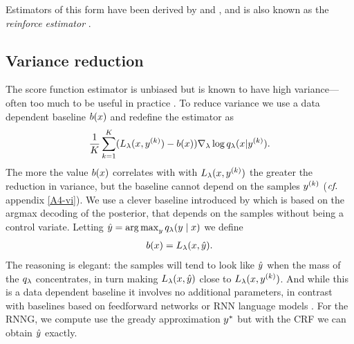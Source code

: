     Estimators of this form have been derived by \citet{williams1992reinforce,paisley2012viss,mnih2014nvil,ranganath2014black} and \citet{mnih2016variational}, and is also known as the \textit{reinforce estimator} \citep{williams1992reinforce}.

  \subsection{Variance reduction}
    The score function estimator is unbiased but is known to have high variance---often too much to be useful in practice  \citep{paisley2012viss}. To reduce variance we use a data dependent baseline $b(x)$ and redefine the estimator as
    \begin{align}
      \frac{1}{K}\sum_{k=1}^K  (L_{\lambda}(x, y^{(k)}) - b(x))\nabla_{\lambda} \log q_{\lambda}(x | y^{(k)}).
    \end{align}
    The more the value $b(x)$ correlates with with $L_{\lambda}(x, y^{(k)})$ the greater the reduction in variance, but the baseline cannot depend on the samples $y^{(k)}$ ($\emph{cf.}$ appendix \ref{A4-vi}). We use a clever baseline introduced by \citet{rennie2017argmax} which is based on the argmax decoding of the posterior, that  depends on the samples without being a control variate. Letting $\hat{y} = \operatorname*{arg\,max}_y q_{\lambda}(y \mid x)$ we define
    \begin{align}
      b(x) = L_{\lambda}(x, \hat{y}).
    \end{align}
    The reasoning is elegant: the samples will tend to look like $\hat{y}$ when the mass of the $q_{\lambda}$ concentrates, in turn making $L_{\lambda}(x, \hat{y})$ close to $L_{\lambda}(x, y^{(k)})$. And while this is a data dependent baseline it involves no additional parameters, in contrast with baselines based on feedforward networks \citep{mnih2014nvil, miao2016discrete} or RNN language models \citep{yin2018structvae}. For the RNNG, we compute use the gready approximation $y^*$ but with the CRF we can obtain $\hat{y}$ exactly.

